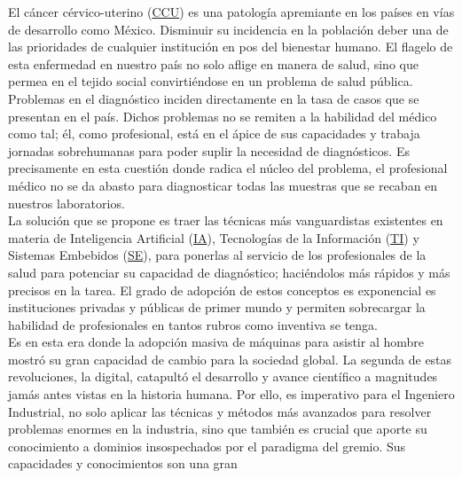     El cáncer cérvico-uterino (\hyperlink{abbr}{CCU}) es una patología apremiante en los países en vías de
    desarrollo como México. Disminuir su incidencia en la población deber una de
    las prioridades de cualquier institución en pos del bienestar humano. El
    flagelo de esta enfermedad en nuestro país no solo aflige en manera de
    salud, sino que permea en el tejido social convirtiéndose en un problema de
    salud pública.~\cite{INEGI2018} \\
    Problemas en el diagnóstico inciden directamente en la tasa de casos que se
    presentan en el país. Dichos problemas no se remiten a la habilidad del
    médico como tal; él, como profesional, está en el ápice de sus capacidades y
    trabaja jornadas sobrehumanas para poder suplir la necesidad de
    diagnósticos. Es precisamente en esta cuestión donde radica el núcleo del
    problema, el profesional médico no se da abasto para diagnosticar todas las
    muestras que se recaban en nuestros laboratorios.~\cite{Ahlan2014} \\    
    La solución que se propone es traer las técnicas más vanguardistas
    existentes en materia de Inteligencia Artificial
    (\hyperlink{abbr}{IA}),
    Tecnologías de la Información
    (\hyperlink{abbr}{TI}) y
    Sistemas Embebidos (\hyperlink{abbr}{SE}), para ponerlas al servicio de los profesionales de la salud para
    potenciar su capacidad de diagnóstico; haciéndolos más rápidos y más
    precisos en la tarea. El grado de adopción de estos conceptos es exponencial
    es instituciones privadas y públicas de primer mundo y permiten sobrecargar
    la habilidad de profesionales en tantos rubros como inventiva se
    tenga.~\cite{Bhaskar2016}\\
    Es en esta era donde la adopción masiva de máquinas para asistir al hombre
    mostró su gran capacidad de cambio para la sociedad global. La segunda de
    estas revoluciones, la digital, catapultó el desarrollo y avance científico
    a magnitudes jamás antes vistas en la historia humana. Por ello, es
    imperativo para el Ingeniero Industrial, no solo aplicar las técnicas y
    métodos más avanzados para resolver problemas enormes en la industria, sino
    que también es crucial que aporte su conocimiento a dominios insospechados
    por el paradigma del gremio. Sus capacidades y conocimientos son una gran
